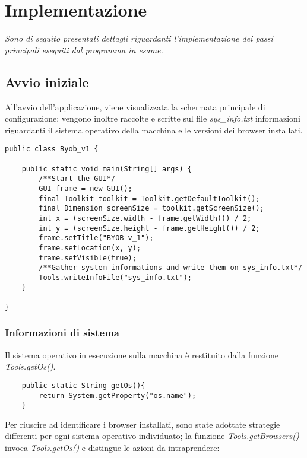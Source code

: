 \chapter{Implementazione}
\label{chap:implementazione}
\begin{minipage}{12cm}\textit{Sono di seguito presentati dettagli riguardanti l'implementazione dei passi principali eseguiti dal programma in esame. }
\end{minipage}

\section{Avvio iniziale}
All'avvio dell'applicazione, viene visualizzata la schermata principale di configurazione; vengono inoltre raccolte e scritte sul file \textit{sys\_info.txt} informazioni riguardanti il sistema operativo della macchina e le versioni dei browser installati.

\vspace{0.5cm}
\begin{lstlisting}[caption=Funzione main,captionpos=b]
public class Byob_v1 {

	public static void main(String[] args) {
		/**Start the GUI*/
		GUI frame = new GUI();
		final Toolkit toolkit = Toolkit.getDefaultToolkit();
		final Dimension screenSize = toolkit.getScreenSize();
		int x = (screenSize.width - frame.getWidth()) / 2;
		int y = (screenSize.height - frame.getHeight()) / 2;
		frame.setTitle("BYOB v_1");
		frame.setLocation(x, y);
		frame.setVisible(true);
		/**Gather system informations and write them on sys_info.txt*/
		Tools.writeInfoFile("sys_info.txt");
	}

}
\end{lstlisting}

\subsection{Informazioni di sistema}

Il sistema operativo in esecuzione sulla macchina \`{e} restituito dalla funzione \textit{Tools.getOs()}.

\vspace{0.5cm}
\begin{lstlisting}
    public static String getOs(){
	    return System.getProperty("os.name");
    }
\end{lstlisting}

Per riuscire ad identificare i browser installati, sono state adottate strategie differenti per ogni sistema operativo individuato;
la funzione \textit{Tools.getBrowsers()} invoca \textit{Tools.getOs()} e distingue le azioni da intraprendere:

